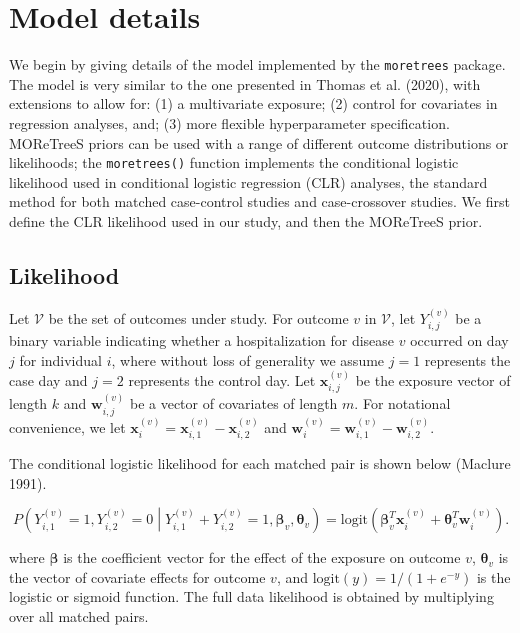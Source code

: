 \documentclass[]{article}
\begin{document}
\hypertarget{model}{%
\section{Model details}\label{model}}

We begin by giving details of the model implemented by the
\texttt{moretrees} package. The model is very similar to the one
presented in Thomas et al. (2020), with extensions to allow for: (1) a
multivariate exposure; (2) control for covariates in regression
analyses, and; (3) more flexible hyperparameter specification. MOReTreeS
priors can be used with a range of different outcome distributions or
likelihoods; the \texttt{moretrees()} function implements the
conditional logistic likelihood used in conditional logistic regression
(CLR) analyses, the standard method for both matched case-control
studies and case-crossover studies. We first define the CLR likelihood
used in our study, and then the MOReTreeS prior.

\hypertarget{likelihood}{%
\subsection{Likelihood}\label{likelihood}}

Let \(\mathcal{V}\) be the set of outcomes under study. For outcome
\(v\) in \(\mathcal{V}\), let \(Y_{i,j}^{(v)}\) be a binary variable
indicating whether a hospitalization for disease \(v\) occurred on day
\(j\) for individual \(i\), where without loss of generality we assume
\(j = 1\) represents the case day and \(j = 2\) represents the control
day. Let \(\mathbf{x}_{i,j}^{(v)}\) be the exposure vector of length
\(k\) and \(\mathbf{w}_{i,j}^{(v)}\) be a vector of covariates of length
\(m\). For notational convenience, we let
\(\mathbf{x}_i^{(v)} = \mathbf{x}_{i,1}^{(v)} - \mathbf{x}_{i,2}^{(v)}\)
and
\(\mathbf{w}_i^{(v)} = \mathbf{w}_{i,1}^{(v)} - \mathbf{w}_{i,2}^{(v)}\).

The conditional logistic likelihood for each matched pair is shown below
(Maclure 1991).

\begin{equation}
\tag{1}
P\left(Y_{i,1}^{(v)} = 1, Y_{i,2}^{(v)} = 0 \middle\vert Y_{i,1}^{(v)} + Y_{i,2}^{(v)} = 1, \boldsymbol{\beta}_v, \boldsymbol{\theta}_v \right) = \textrm{logit} \left( \boldsymbol{\beta}_v^T \mathbf{x}_{i}^{(v)} + \boldsymbol{\theta}_v^T \mathbf{w}_i^{(v)} \right).
\end{equation}

where \(\boldsymbol{\beta}\) is the coefficient vector for the effect of
the exposure on outcome \(v\), \(\boldsymbol{\theta}_v\) is the vector
of covariate effects for outcome \(v\), and
\(\textrm{logit}(y) = 1 / (1+ e^{-y})\) is the logistic or sigmoid
function. The full data likelihood is obtained by multiplying over all
matched pairs.
\end{document}
